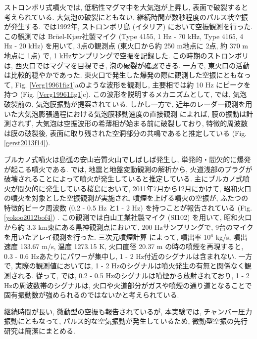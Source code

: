 \documentclass[12pt]{article}
\begin{document}
ストロンボリ式噴火では, 低粘性マグマ中を大気泡が上昇し, 表面で破裂すると考えられている. 大気泡の破裂にともない, 継続時間が数秒程度のパルス状空振が発生する. 
\cite{Vergniolle1996b} では1992年, ストロンボリ島 (イタリア) において空振観測を行った. この観測では Br\"uel-Kj\ae r社製マイク (Type 4155, 1 Hz - 70 kHz, Type 4165, 4 Hz - 20 kHz) を用いて, 3点の観測点 (東火口から約 250 m地点に 2点, 約 370 m地点に 1点) で, 1 kHzサンプリングで空振を記録した. 
この時期のストロンボリは, 西火口ではマグマを目視でき, 泡の破裂が確認できる. 一方で, 東火口の活動は比較的穏やかであった. 
東火口で発生した爆発の際に観測した空振にともなって, Fig. \ref{Verg19961fig1}aのような波形を観測し, 主要相では約 10 Hz にピークを持つ (Fig. \ref{Verg19961fig1}c). この波形を説明するメカニズムとして, \cite{Vergniolle1996c} では, 気泡破裂前の, 気泡膜振動が提案されている. 
しかし一方で, 近年のレーダー観測を用いた大気泡膨張過程における気泡膜移動速度の直接観測   \citep{Gerst2013a} によれば, 膜の振動は計測されず, 大気泡は空振波形の希薄相が始まる前に破裂しており, 特徴的周波数は膜の破裂後, 表面に取り残された空洞部分の共鳴であると推定している (Fig. \ref{gerst2013f14}).


ブルカノ式噴火は島弧の安山岩質火山でしばしば発生し, 単発的・間欠的に爆発が起こる噴火である. \cite{Iguchi2008}では, 地震と地盤変動観測の解析から, 火道浅部のプラグが破壊されることによって噴火が発生していると推定している.
主にブルカノ式噴火が間欠的に発生している桜島において, 2011年7月から12月にかけて, 昭和火口の噴火を対象とした空振観測が実施され, 噴煙を上げる噴火の空振が, ふたつの特徴的ピーク周波数 (0.2 - 0.5 Hz と1 - 2 Hz) を持つことが報告されている (Fig. \ref{yokoo2012bof4}) \citep{yokoo2012bo}. この観測では白山工業社製マイク (SI102) を用いて, 昭和火口から約 3.3 km東にある黒神観測点において, 200 Hzサンプリングで, 9台のマイクを用いたアレイ観測を行った.
三次元噴煙計算 \citep{Suzuki2005} によって, 噴出率 10$^6$ kg/s, 噴出速度 133.67 m/s, 温度 1273.15 K, 火口直径 20.37 m の時の噴煙を再現すると, 0.3 - 0.6 Hzあたりにパワーが集中し, 1 - 2 Hz付近のシグナルは含まれない. 
一方で, 実際の観測値においては, 1 - 2 Hzのシグナルは噴火発生の有無と関係なく観測される. 従って, \cite{yokoo2012bo} では, 0.2 - 0.5 Hzのシグナルは噴煙から放射されており, 1 - 2 Hzの周波数帯のシグナルは, 火口や火道部分がガスや噴煙の通り道となることで固有振動数が強められるのではないかと考えられている. 




継続時間が長い, 微動型の空振も報告されているが, 本実験では, チャンバー圧力振動にともなって, パルス的な空気振動が発生しているため, 微動型空振の先行研究は簡潔にまとめる. 
\end{document}

